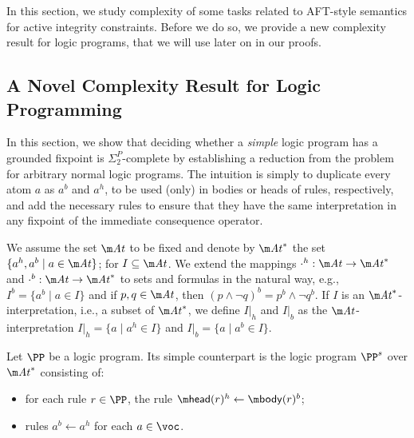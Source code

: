 
In this section, we study complexity of some tasks related to AFT-style semantics for active integrity constraints. 
Before we do so, we provide a new complexity result for logic programs, that we will use later on in our proofs. 

\subsection{A Novel Complexity Result for Logic Programming} 

In this section, we show that deciding whether a \emph{simple} logic program has a grounded fixpoint is $\Sigma^P_2$-complete by establishing a reduction from the problem for arbitrary normal logic programs. 
The intuition is simply to duplicate every atom $a$ as $a^b$ and $a^h$, to be used (only) in bodies or heads of rules, respectively, and add the necessary rules to ensure that they have the same interpretation in any fixpoint of the immediate consequence operator.

We assume the set $\atoms$ to be fixed and denote by $\atoms^*$ the set $\{a^h,a^b\mid a \in \atoms\}$; for $I\subseteq\atoms$. 
We extend the mappings $\cdot^h:\atoms \to \atoms^*$ and $\cdot^b:\atoms \to \atoms^*$ to sets and formulas 
in the natural way, e.g., $I^b=\{a^b\mid a\in I\}$ and  if $p,q\in \atoms$, then $(p\land \lnot q)^b = p^b\land \lnot q^b$. 
If $I$ is an $\atoms^*$-interpretation, i.e., a subset of $\atoms^*$,  we define $I|_h$ and $I|_b$ as the $\atoms$-interpretation $I|_h=\{a\mid a^h\in I\}$  and $I|_b=\{a\mid a^b\in I\}$. 

\begin{definition}
  Let $\PP$ be a logic program.
  Its simple counterpart is the logic program $\PP^s$ over $\atoms^*$ consisting of:
  \begin{itemize}
  \item for each rule $r\in\PP$, the rule $\head(r)^h\leftarrow\body(r)^b$;
  \item rules $a^b\leftarrow a^h$ for each $a\in\voc$.
  \end{itemize}
\end{definition}

